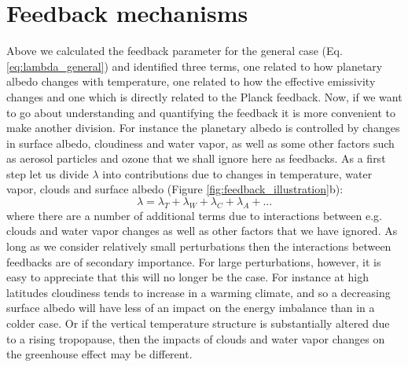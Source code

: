 \documentclass[12pt]{book}
\begin{document}
\section{Feedback mechanisms}
Above we calculated the feedback parameter for the general case (Eq. \ref{eq:lambda_general}) and identified three terms, one related to how planetary albedo changes with temperature, one related to how the effective emissivity changes and one which is directly related to the Planck feedback. Now, if we want to go about understanding and quantifying the feedback it is more convenient to make another division. For instance the planetary albedo is controlled by changes in surface albedo, cloudiness and water vapor, as well as some other factors such as aerosol particles and ozone that we shall ignore here as feedbacks. 
As a first step let us divide $\lambda$ into contributions due to changes in temperature, water vapor, clouds and surface albedo (Figure \ref{fig:feedback_illustration}b):
\begin{equation}
\lambda =  \lambda_T + \lambda_W + \lambda_C + \lambda_A + ...
\label{eq:lambda_linear_sum}
\end{equation}
where there are a number of additional terms due to interactions between e.g. clouds and water vapor changes as well as other factors that we have ignored. As long as we consider relatively small perturbations  then the interactions between feedbacks are of secondary importance. For large perturbations, however, it is easy to appreciate that this will no longer be the case. For instance at high latitudes cloudiness tends to increase in a warming climate, and so a decreasing surface albedo will have less of an impact on the energy imbalance than in a colder case. Or if the vertical temperature structure is substantially altered due to a rising tropopause, then the impacts of clouds and water vapor changes on the greenhouse effect may be different.
\end{document}
